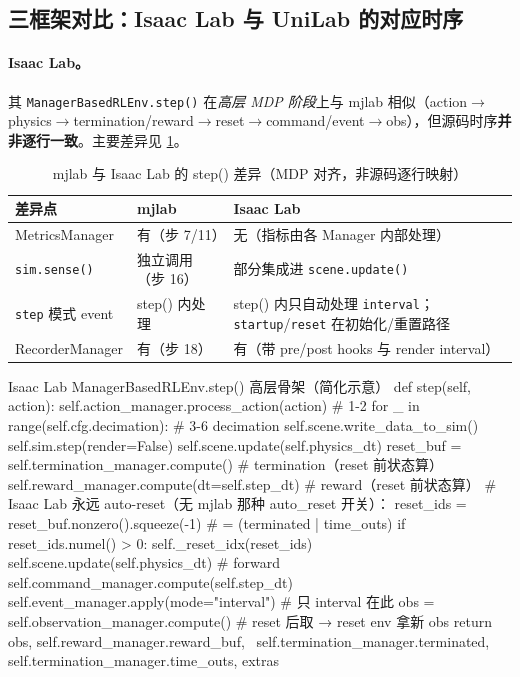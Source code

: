 \subsection{三框架对比：Isaac Lab 与 UniLab 的对应时序}

\paragraph{Isaac Lab。}其 \verb|ManagerBasedRLEnv.step()| 在\emph{高层 MDP 阶段}上与 mjlab 相似（action$\to$physics$\to$termination/reward$\to$reset$\to$command/event$\to$obs），但源码时序\textbf{并非逐行一致}。主要差异见 \cref{tab:rlmc-mgr-stepdiff}。

\begin{table}[ht]
\centering
\caption{mjlab 与 Isaac Lab 的 step() 差异（MDP 对齐，非源码逐行映射）}
\label{tab:rlmc-mgr-stepdiff}
\small
\begin{tabular}{@{}lll@{}}
\toprule
差异点 & mjlab & Isaac Lab \\
\midrule
MetricsManager & 有（步 7/11） & 无（指标由各 Manager 内部处理） \\
\verb|sim.sense()| & 独立调用（步 16） & 部分集成进 \verb|scene.update()| \\
\verb|step| 模式 event & step() 内处理 & step() 内只自动处理 \verb|interval|；\verb|startup|/\verb|reset| 在初始化/重置路径 \\
RecorderManager & 有（步 18） & 有（带 pre/post hooks 与 render interval） \\
\bottomrule
\end{tabular}
\end{table}

\begin{codebox}[Python]{Isaac Lab ManagerBasedRLEnv.step() 高层骨架（简化示意）}
def step(self, action):
    self.action_manager.process_action(action)          # 1-2
    for _ in range(self.cfg.decimation):                # 3-6 decimation
        self.scene.write_data_to_sim()
        self.sim.step(render=False)
        self.scene.update(self.physics_dt)
    reset_buf = self.termination_manager.compute()      # termination（reset 前状态算）
    self.reward_manager.compute(dt=self.step_dt)        # reward（reset 前状态算）
    # Isaac Lab 永远 auto-reset（无 mjlab 那种 auto_reset 开关）：
    reset_ids = reset_buf.nonzero().squeeze(-1)         # = (terminated | time_outs)
    if reset_ids.numel() > 0:
        self._reset_idx(reset_ids)
    self.scene.update(self.physics_dt)                   # forward
    self.command_manager.compute(self.step_dt)
    self.event_manager.apply(mode="interval")           # 只 interval 在此
    obs = self.observation_manager.compute()            # reset 后取 → reset env 拿新 obs
    return obs, self.reward_manager.reward_buf, \
        self.termination_manager.terminated, self.termination_manager.time_outs, extras
\end{codebox}

